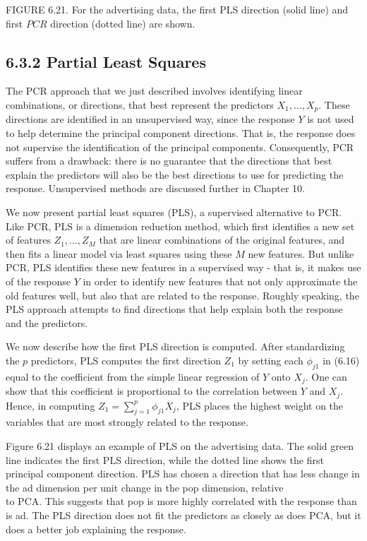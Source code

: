 \documentclass[10pt]{article}
\begin{document}
FIGURE 6.21. For the advertising data, the first PLS direction (solid line) and first $P C R$ direction (dotted line) are shown.

\subsection*{6.3.2 Partial Least Squares}
The PCR approach that we just described involves identifying linear combinations, or directions, that best represent the predictors $X_{1}, \ldots, X_{p}$. These directions are identified in an unsupervised way, since the response $Y$ is not used to help determine the principal component directions. That is, the response does not supervise the identification of the principal components. Consequently, PCR suffers from a drawback: there is no guarantee that the directions that best explain the predictors will also be the best directions to use for predicting the response. Unsupervised methods are discussed further in Chapter 10.

We now present partial least squares (PLS), a supervised alternative to PCR. Like PCR, PLS is a dimension reduction method, which first identifies a new set of features $Z_{1}, \ldots, Z_{M}$ that are linear combinations of the original features, and then fits a linear model via least squares using these $M$ new features. But unlike PCR, PLS identifies these new features in a supervised way - that is, it makes use of the response $Y$ in order to identify new features that not only approximate the old features well, but also that are related to the response. Roughly speaking, the PLS approach attempts to find directions that help explain both the response and the predictors.

We now describe how the first PLS direction is computed. After standardizing the $p$ predictors, PLS computes the first direction $Z_{1}$ by setting each $\phi_{j 1}$ in (6.16) equal to the coefficient from the simple linear regression of $Y$ onto $X_{j}$. One can show that this coefficient is proportional to the correlation between $Y$ and $X_{j}$. Hence, in computing $Z_{1}=\sum_{j=1}^{p} \phi_{j 1} X_{j}$, PLS places the highest weight on the variables that are most strongly related to the response.

Figure 6.21 displays an example of PLS on the advertising data. The solid green line indicates the first PLS direction, while the dotted line shows the first principal component direction. PLS has chosen a direction that has less change in the ad dimension per unit change in the pop dimension, relative\\
to PCA. This suggests that pop is more highly correlated with the response than is ad. The PLS direction does not fit the predictors as closely as does PCA, but it does a better job explaining the response.
\end{document}
